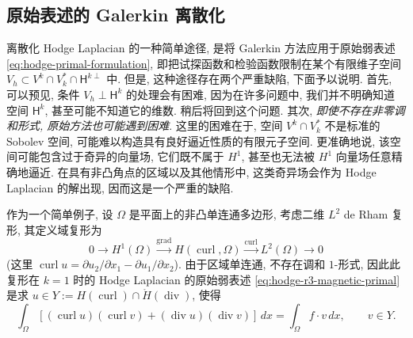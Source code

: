 \subsection{{原始表述的 Galerkin 离散化}}\label{sec:primal-galerkin}

{离散化 Hodge Laplacian 的一种简单途径, 是将 Galerkin 方法应用于原始弱表述 \eqref{eq:hodge-primal-formulation}, 即把试探函数和检验函数限制在某个有限维子空间 $V_h\subset V^k\cap V_k^*\cap\mathsf H^{k\perp}$ 中. 但是, 这种途径存在两个严重缺陷, 下面予以说明. 首先, 可以预见, 条件 $V_h\perp\mathsf H^k$ 的处理会有困难, 因为在许多问题中, 我们并不明确知道空间 $\mathsf H^k$, 甚至可能不知道它的维数. 稍后将回到这个问题. 其次, \emph{即使不存在非零调和形式, 原始方法也可能遇到困难}. 这里的困难在于, 空间 $V^k\cap V_k^*$ 不是标准的 Sobolev 空间, 可能难以构造具有良好逼近性质的有限元子空间. 更准确地说, 该空间可能包含过于奇异的向量场, 它们既不属于 $H^1$, 甚至也无法被 $H^1$ 向量场任意精确地逼近. 在具有非凸角点的区域以及其他情形中, 这类奇异场会作为 Hodge Laplacian 的解出现, 因而这是一个严重的缺陷.}

{作为一个简单例子, 设 $\Omega$ 是平面上的非凸单连通多边形, 考虑二维 $L^2$ de Rham 复形, 其定义域复形为}
\[
0\to H^1(\Omega)\xrightarrow{\operatorname{grad}}H(\operatorname{curl},\Omega)\xrightarrow{\operatorname{curl}}L^2(\Omega)\to0
\]
{(这里 $\operatorname{curl}u=\partial u_2/\partial x_1-\partial u_1/\partial x_2$). 由于区域单连通, 不存在调和 $1$-形式, 因此此复形在 $k=1$ 时的 Hodge Laplacian 的原始弱表述 \eqref{eq:hodge-r3-magnetic-primal} 是求 $u\in Y:=H(\operatorname{curl})\cap\mathring H(\operatorname{div})$, 使得}
\begin{equation}\label{eq:primal-galerkin-polygon}
\int_\Omega[(\operatorname{curl}u)(\operatorname{curl}v)+(\operatorname{div}u)(\operatorname{div}v)]\,dx=\int_\Omega f\cdot v\,dx,\qquad v\in Y.
\end{equation}

